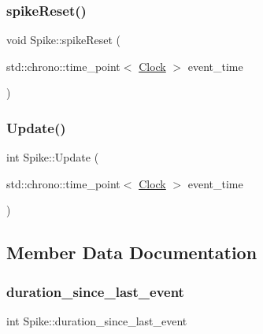 \mbox{\label{classSpike_acce1cc96e84e7cbf3b68010ab32f045e}} 
\subsubsection{\texorpdfstring{spike\+Reset()}{spikeReset()}}
{\footnotesize\ttfamily void Spike\+::spike\+Reset (\begin{DoxyParamCaption}\item[{std\+::chrono\+::time\+\_\+point$<$ \mbox{\hyperlink{universe_8h_a0ef8d951d1ca5ab3cfaf7ab4c7a6fd80}{Clock}} $>$}]{event\+\_\+time }\end{DoxyParamCaption})\hspace{0.3cm}{\ttfamily [inline]}}

\mbox{\label{classSpike_a683a0ca5e62e68777381fc85f4bf3019}} 
\subsubsection{\texorpdfstring{Update()}{Update()}}
{\footnotesize\ttfamily int Spike\+::\+Update (\begin{DoxyParamCaption}\item[{std\+::chrono\+::time\+\_\+point$<$ \mbox{\hyperlink{universe_8h_a0ef8d951d1ca5ab3cfaf7ab4c7a6fd80}{Clock}} $>$}]{event\+\_\+time }\end{DoxyParamCaption})}



\subsection{Member Data Documentation}
\mbox{\label{classSpike_a572287432bfe6202f85b2dd1822715c1}} 
\subsubsection{\texorpdfstring{duration\+\_\+since\+\_\+last\+\_\+event}{duration\_since\_last\_event}}
{\footnotesize\ttfamily int Spike\+::duration\+\_\+since\+\_\+last\+\_\+event\hspace{0.3cm}{\ttfamily [private]}}

